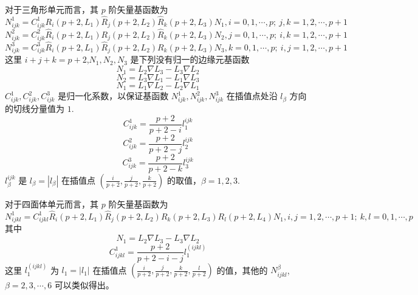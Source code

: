 \documentclass[12pt,a4paper]{article}
\begin{document}
对于三角形单元而言，其 $p$ 阶矢量基函数为
$$
N^1_{ijk}=C^1_{ijk}R_i (p+2,L_1)\hat{R}_j (p+2,L_2)\hat{R}_k (p+2,L_3)N_1,i=0,1,\cdots,p;~j,k=1,2,\cdots,p+1
$$
$$
N^2_{ijk}=C^2_{ijk}\hat{R}_i (p+2,L_1)R_j (p+2,L_2)\hat{R}_k (p+2,L_3)N_2,j=0,1,\cdots,p;~i,k=1,2,\cdots,p+1
$$
$$
N^3_{ijk}=C^3_{ijk}\hat{R}_i (p+2,L_1)\hat{R}_j (p+2,L_2)R_k (p+2,L_3)N_3,k=0,1,\cdots,p;~i,j=1,2,\cdots,p+1
$$
这里 $i+j+k=p+2$,$N_1,N_2,N_3$ 是下列没有归一的边缘元基函数
$$
N_1=L_2 \nabla L_3-L_3\nabla L_2
$$
$$
N_2=L_3 \nabla L_1-L_1\nabla L_3
$$
$$
N_1=L_1 \nabla L_2-L_2\nabla L_1
$$
$C^1_{ijk},C^2_{ijk},C^3_{ijk}$ 是归一化系数，以保证基函数 $N^1_{ijk},N^2_{ijk},N^3_{ijk}$ 在插值点处沿 $l_{\beta}$ 方向的切线分量值为 $1$.
$$
C^1_{ijk}=\frac{p+2}{p+2-i}l^{ijk}_1
$$
$$
C^2_{ijk}=\frac{p+2}{p+2-j}l^{ijk}_2
$$
$$
C^3_{ijk}=\frac{p+2}{p+2-k}l^{ijk}_3
$$
$l^{ijk}_{\beta}$ 是 $l_{\beta}=|l_{\beta}|$ 在插值点 $(\frac{i}{p+2},\frac{j}{p+2},\frac{k}{p+2})$ 的取值，$\beta=1,2,3$.



对于四面体单元而言，其 $p$ 阶矢量基函数为
$$
N^1_{ijkl}=C^1_{ijkl}\hat{R}_i (p+2,L_1)\hat{R}_j (p+2,L_2){R}_k (p+2,L_3){R}_l (p+2,L_4)N_1,i,j=1,2,\cdots,p+1;~k,l=0,1,\cdots,p
$$
其中
$$
N_1=L_2 \nabla L_3-L_3 \nabla L_2
$$
$$
C^1_{ijkl}=\frac{p+2}{p+2-i-j}l^(ijkl)_1
$$
这里 $l^(ijkl)_1$ 为 $l_1=|l_1|$ 在插值点 $(\frac{i}{p+2},\frac{j}{p+2},\frac{k}{p+2},\frac{l}{p+2})$ 的值，其他的 $N^{\beta}_{ijkl}$,$\beta =2,3,\cdots,6$ 可以类似得出。




























%
\end{document}
